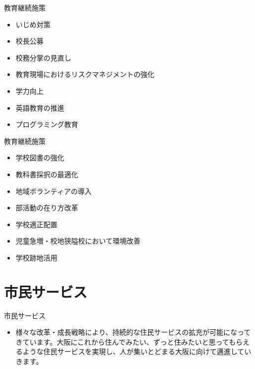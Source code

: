 \documentclass[dvipdfmx]{beamer}
\begin{document}
    \begin{frame}{教育}{継続施策}
        \begin{small}
            \begin{itemize}
                \setlength{\itemsep}{2mm}
                \item いじめ対策
                \item 校長公募
                \item 校務分掌の見直し
                \item 教育現場におけるリスクマネジメントの強化
                \item 学力向上
                \item 英語教育の推進
                \item プログラミング教育
            \end{itemize}
        \end{small}
    \end{frame}

    \begin{frame}{教育}{継続施策}
        \begin{small}
            \begin{itemize}
                \setlength{\itemsep}{2mm}
                \item 学校図書の強化
                \item 教科書採択の最適化
                \item 地域ボランティアの導入
                \item 部活動の在り方改革
                \item 学校適正配置
                \item 児童急増・校地狭隘校において環境改善
                \item 学校跡地活用
            \end{itemize}
        \end{small}
    \end{frame}

\section{市民サービス}
    \begin{frame}
        \sectionpage
    \end{frame}
    
    \begin{frame}{市民サービス}{}
        \begin{small}
            \begin{itemize}
                \setlength{\itemsep}{2mm}
                \item 様々な改革・成長戦略により、持続的な住民サービスの拡充が可能になってきています。大阪にこれから住んでみたい、ずっと住みたいと思ってもらえるような住民サービスを実現し、人が集いとどまる大阪に向けて邁進していきます。
            \end{itemize}
        \end{small}
    \end{frame}
\end{document}
